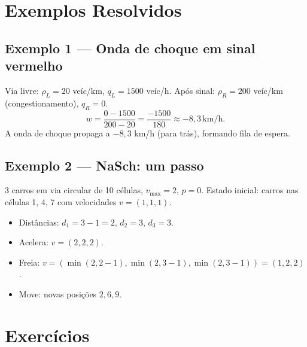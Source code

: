 \documentclass[12pt,a4paper]{article}
\begin{document}
\section*{Exemplos Resolvidos}

\subsection*{Exemplo 1 --- Onda de choque em sinal vermelho}
Via livre: $\rho_L = 20$ ve\'ic/km, $q_L = 1500$ ve\'ic/h.
Ap\'os sinal: $\rho_R = 200$ ve\'ic/km (congestionamento), $q_R = 0$.
\[
w = \frac{0 - 1500}{200 - 20} = \frac{-1500}{180} \approx -8{,}3\,\text{km/h}.
\]
A onda de choque propaga a $-8{,}3$ km/h (para tr\'as), formando fila de espera.

\subsection*{Exemplo 2 --- NaSch: um passo}
3 carros em via circular de 10 c\'elulas, $v_\text{max}=2$, $p=0$.
Estado inicial: carros nas c\'elulas 1, 4, 7 com velocidades $v = (1, 1, 1)$.
\begin{itemize}
  \item Dist\^ancias: $d_1=3-1=2$, $d_2=3$, $d_3=3$.
  \item Acelera: $v=(2, 2, 2)$.
  \item Freia: $v=(\min(2,2-1), \min(2,3-1), \min(2,3-1)) = (1, 2, 2)$.
  \item Move: novas posi\c{c}\~oes $2, 6, 9$.
\end{itemize}

\section*{Exerc\'icios}
\end{document}
